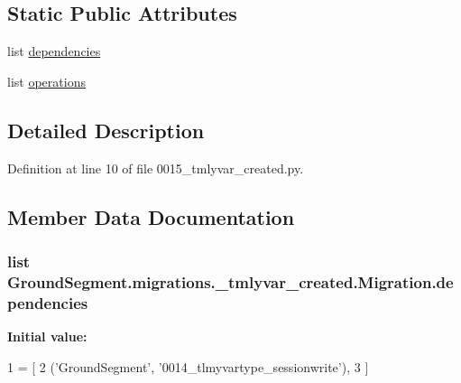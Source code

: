 \subsection*{Static Public Attributes}
\begin{DoxyCompactItemize}
\item 
list \hyperlink{class_ground_segment_1_1migrations_1_10015__tmlyvar__created_1_1_migration_a1671f68e297927a89fead846ae70bd9f}{dependencies}
\item 
list \hyperlink{class_ground_segment_1_1migrations_1_10015__tmlyvar__created_1_1_migration_a698cdca785e05aa4eaa217d3b238d164}{operations}
\end{DoxyCompactItemize}


\subsection{Detailed Description}


Definition at line 10 of file 0015\+\_\+tmlyvar\+\_\+created.\+py.



\subsection{Member Data Documentation}
\hypertarget{class_ground_segment_1_1migrations_1_10015__tmlyvar__created_1_1_migration_a1671f68e297927a89fead846ae70bd9f}{}
\subsubsection[{dependencies}]{\setlength{\rightskip}{0pt plus 5cm}list Ground\+Segment.\+migrations.\+\_\+tmlyvar\+\_\+created.\+Migration.\+dependencies\hspace{0.3cm}{\ttfamily [static]}}\label{class_ground_segment_1_1migrations_1_10015__tmlyvar__created_1_1_migration_a1671f68e297927a89fead846ae70bd9f}
{\bfseries Initial value\+:}
\begin{DoxyCode}
1 = [
2         (\textcolor{stringliteral}{'GroundSegment'}, \textcolor{stringliteral}{'0014\_tlmyvartype\_sessionwrite'}),
3     ]
\end{DoxyCode}


